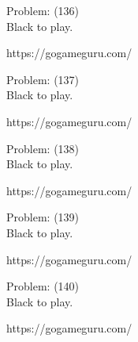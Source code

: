 \documentclass[11pt]{article}
\begin{document}
\begin{minipage}[t]{0.5\textwidth}
  {\centering
  
Problem: (136)\\
Black to play.

https://gogameguru.com/\\
  }
\end{minipage}
\begin{minipage}[t]{0.5\textwidth}
  {\centering
  
Problem: (137)\\
Black to play.

https://gogameguru.com/\\
  }
\end{minipage}
\begin{minipage}[t]{0.5\textwidth}
  {\centering
  
Problem: (138)\\
Black to play.

https://gogameguru.com/\\
  }
\end{minipage}
\begin{minipage}[t]{0.5\textwidth}
  {\centering
  
Problem: (139)\\
Black to play.

https://gogameguru.com/\\
  }
\end{minipage}
\begin{minipage}[t]{0.5\textwidth}
  {\centering
  
Problem: (140)\\
Black to play.

https://gogameguru.com/\\
  }
\end{minipage}
\end{document}
